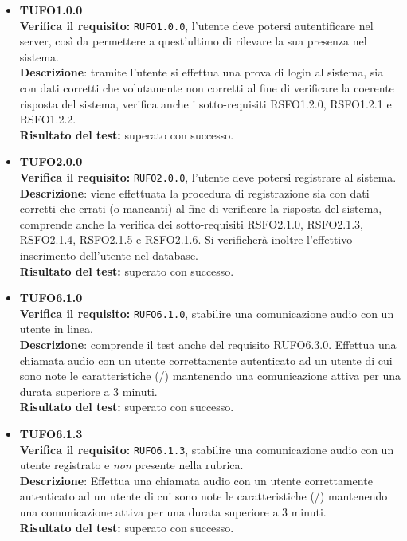 \begin{itemize}
\item \textbf{TUFO1.0.0}\\
\textbf{Verifica il requisito:} \texttt{RUFO1.0.0}, l'utente deve potersi autentificare nel server, così da permettere a quest'ultimo di rilevare la sua presenza nel sistema.\\
\textbf{Descrizione}: tramite l'utente  si effettua una prova di login al sistema, sia con dati corretti che volutamente non corretti al fine di verificare la coerente risposta del sistema, verifica anche i sotto-requisiti RSFO1.2.0, RSFO1.2.1 e RSFO1.2.2.\\
\textbf{Risultato del test:} superato con successo.

\item \textbf{TUFO2.0.0}\\
\textbf{Verifica il requisito:} \texttt{RUFO2.0.0}, l'utente deve potersi registrare al sistema.\\
\textbf{Descrizione}: viene effettuata la procedura di registrazione sia con dati corretti che errati (o mancanti) al fine di verificare la risposta del sistema, comprende anche la verifica dei sotto-requisiti RSFO2.1.0, RSFO2.1.3, RSFO2.1.4, RSFO2.1.5 e RSFO2.1.6. Si verificherà inoltre l'effettivo inserimento dell'utente nel database.\\
\textbf{Risultato del test:} superato con successo.

\item \textbf{TUFO6.1.0}\\ 
\textbf{Verifica il requisito:} \texttt{RUFO6.1.0}, stabilire una comunicazione audio con un utente in linea.\\
\textbf{Descrizione}: comprende il test anche del requisito RUFO6.3.0. Effettua una chiamata audio con un utente  correttamente autenticato ad un utente  di cui sono note le caratteristiche (/) mantenendo una comunicazione attiva per una durata superiore a 3 minuti.\\
\textbf{Risultato del test:} superato con successo.

\item \textbf{TUFO6.1.3}\\ 
\textbf{Verifica il requisito:} \texttt{RUFO6.1.3}, stabilire una comunicazione audio con un utente registrato e \textit{non} presente nella rubrica.\\
\textbf{Descrizione}: Effettua una chiamata audio con un utente  correttamente autenticato ad un utente  di cui sono note le caratteristiche (/) mantenendo una comunicazione attiva per una durata superiore a 3 minuti.\\
\textbf{Risultato del test:} superato con successo.


\end{itemize}
